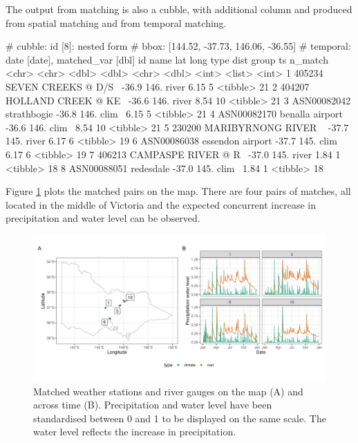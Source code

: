 \documentclass[
]{jss}
\begin{document}
The output from matching is also a cubble, with additional column  and  produced from spatial matching and  from temporal matching.

\begin{CodeChunk}
\begin{CodeOutput}
# cubble:   id [8]: nested form
# bbox:     [144.52, -37.73, 146.06, -36.55]
# temporal: date [date], matched_var [dbl]
  id          name                  lat  long type   dist group ts       n_match
  <chr>       <chr>               <dbl> <dbl> <chr> <dbl> <int> <list>     <int>
1 405234      SEVEN CREEKS @ D/S~ -36.9  146. river  6.15     5 <tibble>      21
2 404207      HOLLAND CREEK @ KE~ -36.6  146. river  8.54    10 <tibble>      21
3 ASN00082042 strathbogie         -36.8  146. clim~  6.15     5 <tibble>      21
4 ASN00082170 benalla airport     -36.6  146. clim~  8.54    10 <tibble>      21
5 230200      MARIBYRNONG RIVER ~ -37.7  145. river  6.17     6 <tibble>      19
6 ASN00086038 essendon airport    -37.7  145. clim~  6.17     6 <tibble>      19
7 406213      CAMPASPE RIVER @ R~ -37.0  145. river  1.84     1 <tibble>      18
8 ASN00088051 redesdale           -37.0  145. clim~  1.84     1 <tibble>      18
\end{CodeOutput}
\end{CodeChunk}

Figure \ref{fig:matching} plots the matched pairs on the map. There are four pairs of matches, all located in the middle of Victoria and the expected concurrent increase in precipitation and water level can be observed.

\begin{CodeChunk}
\begin{figure}

{\centering \includegraphics[width=1\linewidth]{../figures/matching} 

}

\caption[Matched weather stations and river gauges on the map (A) and across time (B)]{Matched weather stations and river gauges on the map (A) and across time (B). Precipitation and water level have been standardised between 0 and 1 to be displayed on the same scale. The water level reflects the increase in precipitation.}\label{fig:matching}
\end{figure}
\end{CodeChunk}
\end{document}
